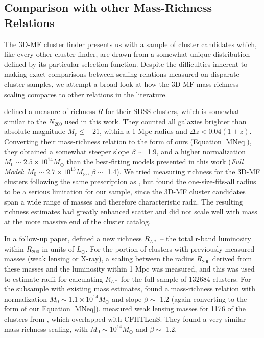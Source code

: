
\subsection{Comparison with other Mass-Richness Relations}

The \ac{3D-MF} cluster finder presents us with a sample of cluster candidates which, like every other cluster-finder, are drawn from a somewhat unique distribution defined by its particular selection function. Despite the difficulties inherent to making exact comparisons between scaling relations measured on disparate cluster samples, we attempt a broad look at how the \ac{3D-MF} mass-richness scaling compares to other relations in the literature.

\citet{Wen09} defined a measure of richness $R$ for their SDSS clusters, which is somewhat similar to the $N_{200}$ used in this work. They counted all galaxies brighter than absolute magnitude $M_r \leq -21$, within a 1 \ac{Mpc} radius and $\Delta z < 0.04(1+z)$. Converting their mass-richness relation to the form of ours (Equation \ref{MNeq}), they obtained a somewhat steeper slope $\beta \sim$ 1.9, and a higher normalization $M_0 \sim 2.5\times10^{14} M_{\odot}$ than the best-fitting models presented in this work ({\it Full Model}: $M_0 \sim 2.7\times10^{13} M_{\odot}$, $\beta \sim$ 1.4). We tried measuring richness for the \ac{3D-MF} clusters following the same prescription as \citet{Wen09}, but found the one-size-fits-all radius to be a serious limitation for our sample, since the \ac{3D-MF} cluster candidates span a wide range of masses and therefore characteristic radii. The resulting richness estimates had greatly enhanced scatter and did not scale well with mass at the more massive end of the cluster catalog.

In a follow-up paper, \citet{Wen12} defined a new richness $R_{L*}$ -- the total r-band luminosity within $R_{200}$ in units of $L_{\odot}$. For the portion of clusters with previously measured masses (weak lensing or X-ray), a scaling between the radius $R_{200}$ derived from these masses and the luminosity within 1 \ac{Mpc} was measured, and this was used to estimate radii for calculating $R_{L*}$ for the full sample of 132684 clusters. For the subsample with existing mass estimates, \citet{Wen12} found a mass-richness relation with normalization $M_0 \sim 1.1 \times 10^{14} M_{\odot}$ and slope $\beta \sim$ 1.2 (again converting to the form of our Equation \ref{MNeq}). \citet{Covone14} measured weak lensing masses for 1176 of the clusters from \citet{Wen12}, which overlapped with \ac{CFHTLenS}. They found a very similar mass-richness scaling, with $M_0 \sim 10^{14} M_{\odot}$ and $\beta \sim$ 1.2. 

